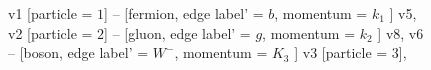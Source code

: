 \documentclass{revtex4}
\begin{document}
\begin{figure}[!htb]
\begin{center}
{    %
v1 [particle = \(1\)] -- [fermion, edge label' = \(b\), momentum = \(k_{1}\) ] v5, 
v2 [particle = \(2\)] -- [gluon, edge label' = \(g\), momentum = \(k_{2}\) ] v8, 
v6 -- [boson, edge label' = \(W^{-}\), momentum = \(K_{3}\) ] v3 [particle = \(3\)], 
}
\end{center}
\end{figure}
\end{document}
